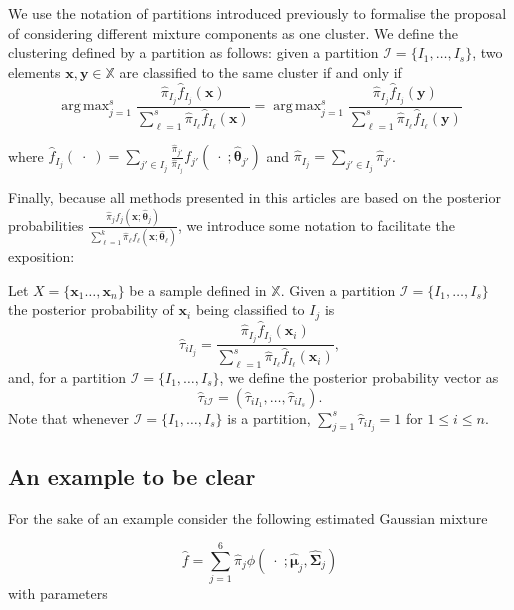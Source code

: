 \documentclass[10pt, a4paper]{article}
\DeclareMathOperator*{\argmax}{arg\,max}
\newcommand{\m}[1]{\boldsymbol{#1}}
\begin{document}
We use the notation of partitions introduced previously to formalise the proposal of considering different mixture components as one cluster. We define the clustering defined by a partition as follows: given a partition $\mathcal{I} = \{ I_1, \dots, I_s\}$, two elements $\m x, \m y \in \mathbb{X}$ are classified to the same cluster if and only if
\begin{equation}\label{cluster_criteria}
\argmax_{j=1}^s \frac{ \hat{\pi}_{I_j} \hat{f}_{I_j}(\m x) }{\sum_{\ell=1}^s \hat{\pi}_{I_\ell} \hat{f}_{I_\ell}(\m x ) } = \argmax_{j=1}^s \frac{ \hat{\pi}_{I_j} \hat{f}_{I_j}(\m y) }{ \sum_{\ell=1}^s \hat{\pi}_{I_\ell} \hat{f}_{I_\ell}(\m y) }
\end{equation}

where $\hat{f}_{I_j}(\; \cdot \;) = \sum_{j' \in I_j} \frac{\hat{\pi}_{j'}}{\hat{\pi}_{I_j}} f_{j'}(\; \cdot \; ; \hat{\m\theta}_{j'})$ and $\hat{\pi}_{I_j} =  \sum_{j' \in I_j} \hat{\pi}_{j'}$.


Finally, because all methods presented in this articles are based on the posterior probabilities $\frac{ \hat{\pi}_j f_j(\m x ; \hat{\m\theta}_j) }{\sum_{\ell=1}^k \hat{\pi}_\ell f_\ell(\m x ; \hat{\m\theta}_\ell) }$, we introduce some notation to facilitate the exposition:


Let $X = \{\m x_1\dots, \m x_n\}$ be a sample defined in $\mathbb{X}$. Given a partition $\mathcal{I} = \{ I_1, \dots, I_s \}$ the posterior probability  of $\m x_i$ being classified to $I_j$ is
\[
\hat{\tau}_{i I_j} =  \frac{ \hat{\pi}_{I_j} \hat{f}_{I_j}(\m x_i) }{\sum_{\ell=1}^s \hat{\pi}_{I_\ell} \hat{f}_{I_\ell}(\m x_i)},
\]
and, for a partition  $\mathcal{I} = \{ I_1, \dots, I_s\}$, we define the posterior probability vector as
\[
\hat{\tau}_{i \mathcal{I}} = \left( \hat{\tau}_{i I_1} , \dots, \hat{\tau}_{i I_s}  \right).
\]
Note that whenever  $\mathcal{I} = \{ I_1, \dots, I_s\}$ is a partition, $\sum_{j=1}^s \hat{\tau}_{i I_j} = 1$ for $1 \leq i \leq n$.

\subsection*{An example to be clear}

For the sake of an example consider the following estimated Gaussian mixture

\[
\hat{f} = \sum_{j=1}^6 \hat{\pi}_j \phi(\;\cdot\; ; \hat{\m\mu}_j, \hat{\m\Sigma}_j)
\]
with parameters
{\small

}
\end{document}
